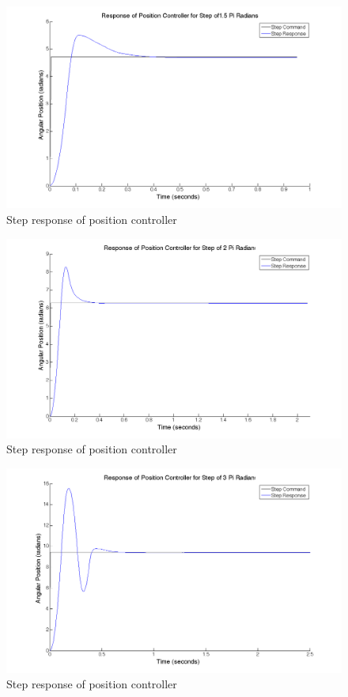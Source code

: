\documentclass{article}
\theoremstyle{plain}
\theoremstyle{definition}
\theoremstyle{remark}
\begin{document}
\begin{figure}
\begin{center}
\includegraphics[width = 14cm]{posstep_15pi.png}
\caption{Step response of position controller}
\label{q5_b2}
\end{center}
\end{figure}

\begin{figure}
\begin{center}
\includegraphics[width = 14cm]{posstep_2pi.png}
\caption{Step response of position controller}
\label{q5_b3}
\end{center}
\end{figure}

\begin{figure}
\begin{center}
\includegraphics[width = 14cm]{posstep_3pi.png}
\caption{Step response of position controller}
\label{q5_b4}
\end{center}
\end{figure}
\end{document}
